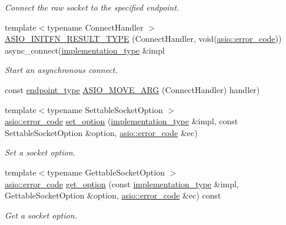 \begin{DoxyCompactItemize}
\begin{DoxyCompactList}\small\item\em Connect the raw socket to the specified endpoint. \end{DoxyCompactList}\item 
{\footnotesize template$<$typename Connect\+Handler $>$ }\\\hyperlink{classasio_1_1raw__socket__service_ac3047cc564a20bfbe6c27c1473969852}{A\+S\+I\+O\+\_\+\+I\+N\+I\+T\+F\+N\+\_\+\+R\+E\+S\+U\+L\+T\+\_\+\+T\+Y\+P\+E} (Connect\+Handler, void(\hyperlink{classasio_1_1error__code}{asio\+::error\+\_\+code})) async\+\_\+connect(\hyperlink{classasio_1_1raw__socket__service_aa2e0ef73d6504fbcab510cb835e9e3d9}{implementation\+\_\+type} \&impl
\begin{DoxyCompactList}\small\item\em Start an asynchronous connect. \end{DoxyCompactList}\item 
const \hyperlink{classasio_1_1raw__socket__service_a8278f352f4e4424d431320f924e8b496}{endpoint\+\_\+type} \hyperlink{classasio_1_1raw__socket__service_af54f7a642f4b7f29acf1b790d71c2022}{A\+S\+I\+O\+\_\+\+M\+O\+V\+E\+\_\+\+A\+R\+G} (Connect\+Handler) handler)
\item 
{\footnotesize template$<$typename Settable\+Socket\+Option $>$ }\\\hyperlink{classasio_1_1error__code}{asio\+::error\+\_\+code} \hyperlink{classasio_1_1raw__socket__service_add7120cd3f4b85a216ab0f80ded04d52}{set\+\_\+option} (\hyperlink{classasio_1_1raw__socket__service_aa2e0ef73d6504fbcab510cb835e9e3d9}{implementation\+\_\+type} \&impl, const Settable\+Socket\+Option \&option, \hyperlink{classasio_1_1error__code}{asio\+::error\+\_\+code} \&ec)
\begin{DoxyCompactList}\small\item\em Set a socket option. \end{DoxyCompactList}\item 
{\footnotesize template$<$typename Gettable\+Socket\+Option $>$ }\\\hyperlink{classasio_1_1error__code}{asio\+::error\+\_\+code} \hyperlink{classasio_1_1raw__socket__service_af43fc20682cef419b4a7db2eca8dec47}{get\+\_\+option} (const \hyperlink{classasio_1_1raw__socket__service_aa2e0ef73d6504fbcab510cb835e9e3d9}{implementation\+\_\+type} \&impl, Gettable\+Socket\+Option \&option, \hyperlink{classasio_1_1error__code}{asio\+::error\+\_\+code} \&ec) const 
\begin{DoxyCompactList}\small\item\em Get a socket option. \end{DoxyCompactList}\item 

\end{DoxyCompactItemize}
